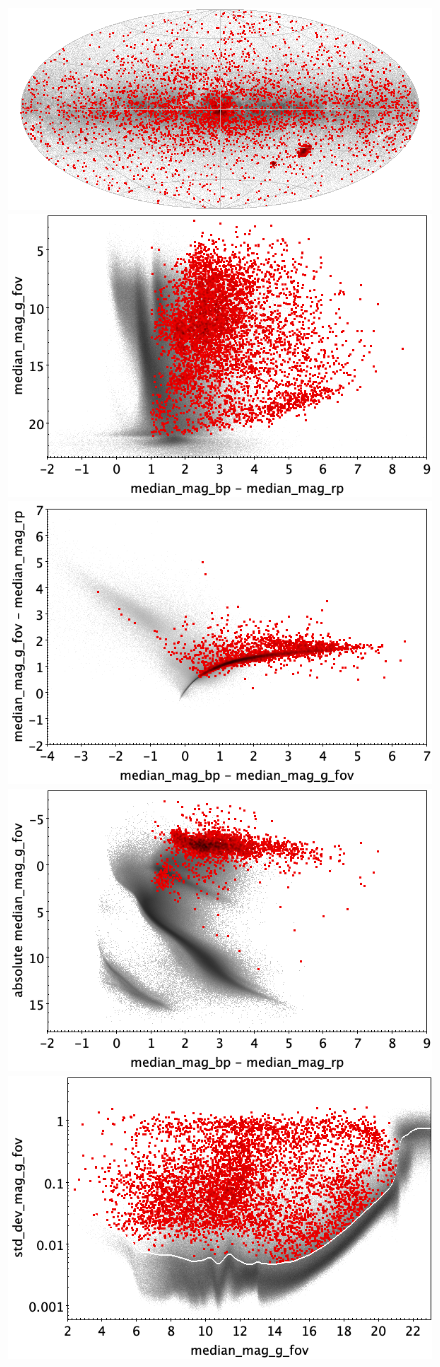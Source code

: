 \documentclass[longauth]{aa}
\begin{document}
\begin{appendix}
\begin{figure}
\centering
{} \includegraphics[width=0.6\hsize]{figures/appendix/LPV_trn_sky.png} \\ %
\vspace{4mm}
 \includegraphics[width=0.45\hsize]{figures/appendix/LPV_trn_cm.png}  %
\hspace{2mm}
 \includegraphics[width=0.45\hsize]{figures/appendix/LPV_trn_cc.png} \\ %
\vspace{4mm}
 \includegraphics[width=0.45\hsize]{figures/appendix/LPV_trn_cam.png}  %
\hspace{2mm}
 \includegraphics[width=0.45\hsize]{figures/appendix/LPV_trn_msd.png} \\ %

\end{figure}
\end{appendix}
\end{document}
